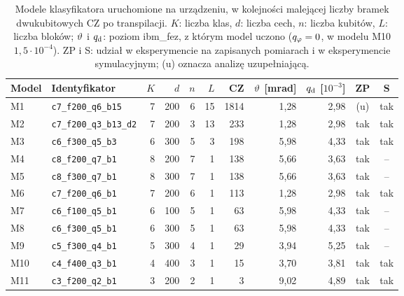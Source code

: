 \begin{table}[htb]
\centering
\caption[Modele klasyfikatora użyte w przebiegach na urządzeniu i w eksperymentach z korektą odczytu]{Modele klasyfikatora uruchomione na urządzeniu, w kolejności malejącej liczby bramek dwukubitowych CZ po transpilacji. $K$: liczba klas, $d$: liczba cech, $n$: liczba kubitów, $L$: liczba bloków; $\vartheta$ i $q_{\mathrm{d}}$: poziom ibm\_fez, z którym model uczono ($q_{\varphi}=0$, w modelu M10 $1{,}5\cdot10^{-4}$). ZP i S: udział w eksperymencie na zapisanych pomiarach i w eksperymencie symulacyjnym; (u) oznacza analizę uzupełniającą.}
\label{tab:cls:models}
\footnotesize
\setlength{\tabcolsep}{5pt}
\begin{tabular}{@{}llrrrrrrrcc@{}}
\toprule
Model & Identyfikator & $K$ & $d$ & $n$ & $L$ & CZ & $\vartheta$ [mrad] & $q_{\mathrm{d}}$ [$10^{-3}$] & ZP & S \\
\midrule
M1 & \texttt{c7\_f200\_q6\_b15} & 7 & 200 & 6 & 15 & 1814 & 1{,}28 & 2{,}98 & (u) & tak \\
M2 & \texttt{c7\_f200\_q3\_b13\_d2} & 7 & 200 & 3 & 13 & 233 & 1{,}28 & 2{,}98 & tak & tak \\
M3 & \texttt{c6\_f300\_q5\_b3} & 6 & 300 & 5 & 3 & 198 & 5{,}98 & 4{,}33 & tak & tak \\
M4 & \texttt{c8\_f200\_q7\_b1} & 8 & 200 & 7 & 1 & 138 & 5{,}66 & 3{,}63 & tak & -- \\
M5 & \texttt{c8\_f300\_q7\_b1} & 8 & 300 & 7 & 1 & 138 & 5{,}66 & 3{,}63 & tak & -- \\
M6 & \texttt{c7\_f200\_q6\_b1} & 7 & 200 & 6 & 1 & 113 & 1{,}28 & 2{,}98 & tak & tak \\
M7 & \texttt{c6\_f100\_q5\_b1} & 6 & 100 & 5 & 1 & 63 & 5{,}98 & 4{,}33 & tak & -- \\
M8 & \texttt{c6\_f300\_q5\_b1} & 6 & 300 & 5 & 1 & 63 & 5{,}98 & 4{,}33 & tak & -- \\
M9 & \texttt{c5\_f300\_q4\_b1} & 5 & 300 & 4 & 1 & 29 & 3{,}94 & 5{,}25 & tak & -- \\
M10 & \texttt{c4\_f400\_q3\_b1} & 4 & 400 & 3 & 1 & 15 & 3{,}70 & 3{,}81 & tak & tak \\
M11 & \texttt{c3\_f200\_q2\_b1} & 3 & 200 & 2 & 1 & 3 & 9{,}02 & 4{,}89 & tak & tak \\
\bottomrule
\end{tabular}
\end{table}

